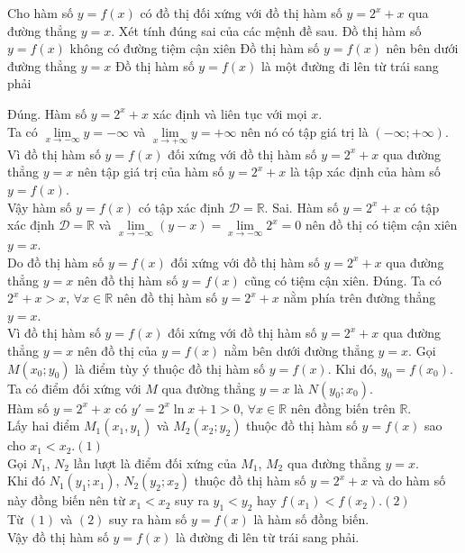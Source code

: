 \begin{ex}%
Cho hàm số $y=f(x)$ có đồ thị đối xứng với đồ thị hàm số $y=2^x+x$ qua đường thẳng $y=x$. Xét tính đúng sai của các mệnh đề sau.
{Đồ thị hàm số $y=f(x)$ không có đường tiệm cận xiên}
{\True Đồ thị hàm số $y=f(x)$ nên bên dưới đường thẳng $y=x$}
{\True Đồ thị hàm số $y=f(x)$ là một đường đi lên từ trái sang phải}

\loigiai
{\begin{itemchoice}
\itemch Đúng. Hàm số $y=2^x+x$  xác định và liên tục với mọi $x$.\\
Ta có $\lim\limits_{x\to -\infty}y=-\infty$ và $\lim\limits_{x\to +\infty}y=+\infty$ nên nó có tập giá trị là $(-\infty;+\infty)$.\\
Vì đồ thị hàm số $y=f(x)$ đối xứng với đồ thị hàm số $y=2^x+x$ qua đường thẳng $y=x$ nên tập giá trị của hàm số $y=2^x+x$ là tập xác định của hàm số $y=f(x)$.\\
Vậy hàm số $y=f(x)$ có tập xác định $\mathscr{D}=\mathbb{R}$.
\itemch Sai. Hàm số $y=2^x+x$ có tập xác định $\mathscr{D}=\mathbb{R}$ và $\lim\limits_{x\to -\infty}(y-x)=\lim\limits_{x\to -\infty} 2^x=0$ nên đồ thị có tiệm cận xiên $y=x$.\\
Do  đồ thị hàm số $y=f(x)$ đối xứng với đồ thị hàm số $y=2^x+x$ qua đường thẳng $y=x$ nên đồ thị hàm số $y=f(x)$ cũng có tiệm cận xiên.
\itemch Đúng. Ta có $2^x+x>x$, $\forall x\in\mathbb{R}$ nên đồ thị hàm số $y=2^x+x$ nằm phía trên đường thẳng $y=x$.\\
Vì đồ thị hàm số $y=f(x)$ đối xứng với đồ thị hàm số $y=2^x+x$ qua đường thẳng $y=x$ nên đồ thị của $y=f(x)$ nằm bên dưới đường thẳng $y=x$.
\itemch Gọi $M(x_0;y_0)$ là điểm tùy ý thuộc đồ thị hàm số $y=f(x)$. Khi đó, $y_0=f(x_0)$.\\
Ta có điểm đối xứng với $M$ qua đường thẳng $y=x$ là $N(y_0;x_0)$.\\
Hàm số $y=2^x+x$ có $y'=2^x\ln x+1>0$, $\forall x\in\mathbb{R}$ nên đồng biến trên $\mathbb{R}$.\\
Lấy hai điểm $M_1(x_1,y_1)$ và $M_2(x_2;y_2)$ thuộc đồ thị hàm số $y=f(x)$ sao cho $x_1<x_2$.\hfill $(1)$\\
Gọi $N_1$, $N_2$ lần lượt là điểm đối xứng của $M_1$, $M_2$ qua đường thẳng $y=x$.\\
Khi đó $N_1(y_1;x_1)$, $N_2(y_2;x_2)$ thuộc đồ thị hàm số $y=2^x+x$ và do hàm số này đồng biến nên từ $x_1<x_2$ suy ra $y_1<y_2$ hay $f(x_1)<f(x_2)$.\hfill $(2)$\\
Từ $(1)$ và $(2)$ suy ra hàm số $y=f(x)$ là hàm số đồng biến.\\
Vậy đồ thị hàm số $y=f(x)$ là đường đi lên từ trái sang phải.
\end{itemchoice}
}
\end{ex}

